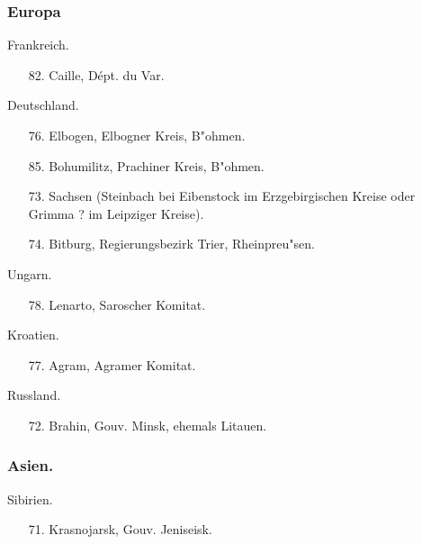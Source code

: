 \documentclass[a4paper, 11pt, oneside, polutonikogreek, german]{article}
\begin{document}
\subsubsection{Europa}
\begin{center}
Frankreich.
\end{center}
\begin{itemize}
    \small
    \item[82.] Caille, Dépt. du Var.
\end{itemize}
\begin{center}
Deutschland.
\end{center}
\begin{itemize}
    \small
    \item[76.] Elbogen, Elbogner Kreis, B"ohmen.
    \item[85.] Bohumilitz, Prachiner Kreis, B"ohmen.
    \item[73.] Sachsen (Steinbach bei Eibenstock im Erzgebirgischen Kreise oder Grimma ? im Leipziger Kreise).
    \item[74.] Bitburg, Regierungsbezirk Trier, Rheinpreu"sen.
\end{itemize}
\begin{center}
Ungarn.
\end{center}
\begin{itemize}
    \small
    \item[78.] Lenarto, Saroscher Komitat.
\end{itemize}
\begin{center}
Kroatien.
\end{center}
\begin{itemize}
    \small
    \item[77.] Agram, Agramer Komitat.
\end{itemize}
\begin{center}
Russland.
\end{center}
\begin{itemize}
    \small
    \item[72.] Brahin, Gouv. Minsk, ehemals Litauen.
\end{itemize}
\subsubsection{Asien.}
\begin{center}
Sibirien.
\end{center}
\begin{itemize}
    \small
    \item[71.] Krasnojarsk, Gouv. Jeniseisk.
\end{itemize}
\end{document}
